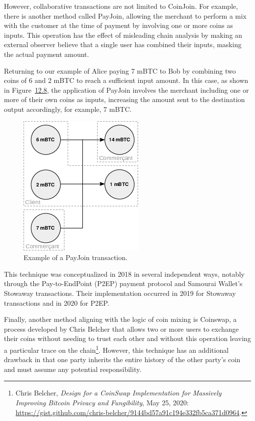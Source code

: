 \documentclass[
  a5paper,
  smalldemyvopaper,10pt,twoside,onecolumn,openright,extrafontsizes,hidelinks]{memoir}
\begin{document}
However, collaborative transactions are not limited to CoinJoin. For
example, there is another method called PayJoin, allowing the merchant
to perform a mix with the customer at the time of payment by involving
one or more coins as inputs. This operation has the effect of misleading
chain analysis by making an external observer believe that a single user
has combined their inputs, masking the actual payment amount.

Returning to our example of Alice paying 7 mBTC to Bob by combining two
coins of 6 and 2 mBTC to reach a sufficient input amount. In this case,
as shown in Figure~\hyperref[fig:payjoin-transaction]{12.8}, the
application of PayJoin involves the merchant including one or more of
their own coins as inputs, increasing the amount sent to the destination
output accordingly, for example, 7 mBTC.

\begin{figure}

{\centering \includegraphics{chapters/img/payjoin-transaction-3i-2o.png}

}

\caption{Example of a PayJoin transaction.}

\end{figure}%

This technique was conceptualized in 2018 in several independent ways,
notably through the Pay-to-EndPoint (P2EP) payment protocol and Samourai
Wallet's Stowaway transactions. Their implementation occurred in 2019
for Stowaway transactions and in 2020 for P2EP.

Finally, another method aligning with the logic of coin mixing is
Coinswap, a process developed by Chris Belcher that allows two or more
users to exchange their coins without needing to trust each other and
without this operation leaving a particular trace on the
chain\footnote{Chris Belcher, \emph{Design for a CoinSwap Implementation
  for Massively Improving Bitcoin Privacy and Fungibility}, May 25,
  2020:
  \url{https://gist.github.com/chris-belcher/9144bd57a91c194e332fb5ca371d0964}.}.
However, this technique has an additional drawback in that one party
inherits the entire history of the other party's coin and must assume
any potential responsibility.
\end{document}
